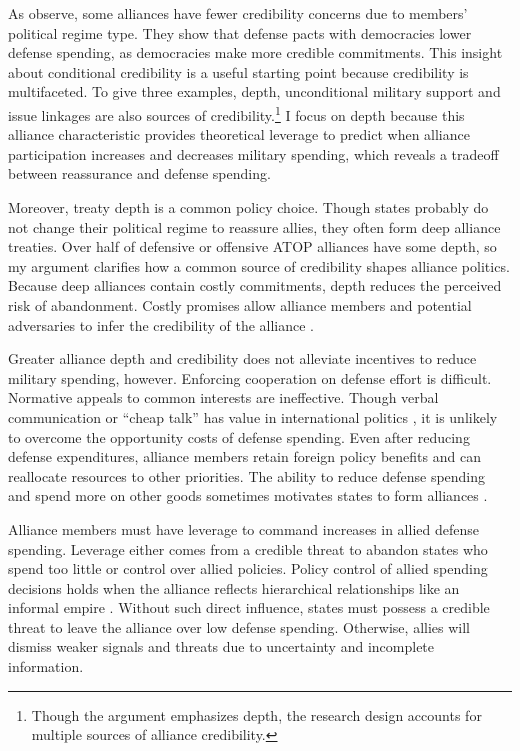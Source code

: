 \documentclass[12pt]{article}
\begin{document}
As \citet{DigiuseppePoast2016} observe, some alliances have fewer credibility concerns due to members' political regime type.
They show that defense pacts with democracies lower defense spending, as democracies make more credible commitments.
This insight about conditional credibility is a useful starting point because credibility is multifaceted. 
To give three examples, depth, unconditional military support \citep{Benson2012, Chibaetal2015} and issue linkages \citep{LongLeeds2006, Poast2012, Poast2013} are also sources of credibility.\footnote{Though the argument emphasizes depth, the research design accounts for multiple sources of alliance credibility.} 
I focus on depth because this alliance characteristic provides theoretical leverage to predict when alliance participation increases and decreases military spending, which reveals a tradeoff between reassurance and defense spending.  


Moreover, treaty depth is a common policy choice. 
Though states probably do not change their political regime to reassure allies, they often form deep alliance treaties. 
Over half of defensive or offensive ATOP alliances have some depth, so my argument clarifies how a common source of credibility shapes alliance politics. 
Because deep alliances contain costly commitments, depth reduces the perceived risk of abandonment.  
Costly promises allow alliance members and potential adversaries to infer the credibility of the alliance \citep{Leeds2003, FuhrmannSechser2014}. 


Greater alliance depth and credibility does not alleviate incentives to reduce military spending, however. 
Enforcing cooperation on defense effort is difficult.
Normative appeals to common interests are ineffective. 
Though verbal communication or ``cheap talk'' has value in international politics \citep{Trager2010}, it is unlikely to overcome the opportunity costs of defense spending. 
Even after reducing defense expenditures, alliance members retain foreign policy benefits and can reallocate resources to other priorities. 
The ability to reduce defense spending and spend more on other goods sometimes motivates states to form alliances \citep{Kimball2010, AllenDigiuseppe2013}. 


Alliance members must have leverage to command increases in allied defense spending. 
Leverage either comes from a credible threat to abandon states who spend too little or control over allied policies. 
Policy control of allied spending decisions holds when the alliance reflects hierarchical relationships like an informal empire \citep{Lake1996}. 
Without such direct influence, states must possess a credible threat to leave the alliance over low defense spending. 
Otherwise, allies will dismiss weaker signals and threats due to uncertainty and incomplete information. 
\end{document}
